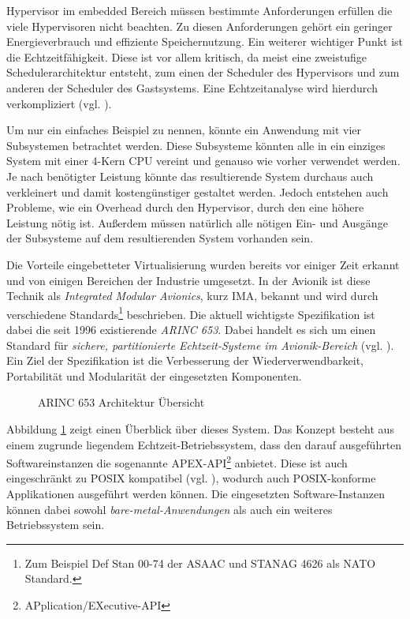 \documentclass[
  a4paper,					    %
  twoside,
  DIV=calc,     				%
  bibliography=totoc,
  cleardoublepage=empty,
  ngerman,     					%
  final       					%
]{scrbook}
\begin{document}
Hypervisor im embedded Bereich müssen bestimmte Anforderungen erfüllen die viele Hypervisoren nicht beachten. Zu diesen Anforderungen gehört ein geringer Energieverbrauch und effiziente Speichernutzung. Ein weiterer wichtiger Punkt ist die Echtzeitfähigkeit. Diese ist vor allem kritisch, da meist eine zweistufige Schedulerarchitektur entsteht, zum einen der Scheduler des Hypervisors und zum anderen der Scheduler des Gastsystems. Eine Echtzeitanalyse wird hierdurch verkompliziert (vgl. \cite{two_lvl_sched}).

Um nur ein einfaches Beispiel zu nennen, könnte ein Anwendung mit vier Subsystemen betrachtet werden. Diese Subsysteme könnten alle in ein einziges System mit einer 4-Kern CPU vereint und genauso wie vorher verwendet werden. Je nach benötigter Leistung könnte das resultierende System durchaus auch verkleinert und damit kostengünstiger gestaltet werden. Jedoch entstehen auch Probleme, wie ein Overhead durch den Hypervisor, durch den eine höhere Leistung nötig ist. Außerdem müssen natürlich alle nötigen Ein- und Ausgänge der Subsysteme auf dem resultierenden System vorhanden sein.

Die Vorteile eingebetteter Virtualisierung wurden bereits vor einiger Zeit erkannt und von einigen Bereichen der Industrie umgesetzt. In der Avionik ist diese Technik als \emph{Integrated Modular Avionics}, kurz IMA, bekannt und wird durch verschiedene Standards\footnote{Zum Beispiel Def Stan 00-74 der ASAAC und STANAG 4626 als NATO Standard.} beschrieben. Die aktuell wichtigste Spezifikation ist dabei die seit 1996 existierende \emph{ARINC 653}. Dabei handelt es sich um einen Standard für \emph{sichere, partitionierte Echtzeit-Systeme im Avionik-Bereich} (vgl. \cite{arinc653_wr}). Ein Ziel der Spezifikation ist die Verbesserung der Wiederverwendbarkeit, Portabilität und Modularität der eingesetzten Komponenten.

\begin{figure}[ht]
    \centering
    
    \caption[ARINC 653 Architektur Übersicht]{ARINC 653 Architektur Übersicht\cite{arinc653_wr}}
    \label{fig:arinc_653}
\end{figure}

Abbildung \ref{fig:arinc_653} zeigt einen Überblick über dieses System. Das Konzept besteht aus einem zugrunde liegendem Echtzeit-Betriebssystem, dass den darauf ausgeführten Softwareinstanzen die sogenannte APEX-API\footnote{APplication/EXecutive-API} anbietet. Diese ist auch eingeschränkt zu POSIX kompatibel (vgl. \cite{wiki:arinc_653}), wodurch auch POSIX-konforme Applikationen ausgeführt werden können. Die eingesetzten Software-Instanzen können dabei sowohl \emph{bare-metal-Anwendungen} als auch ein weiteres Betriebssystem sein.
\end{document}
